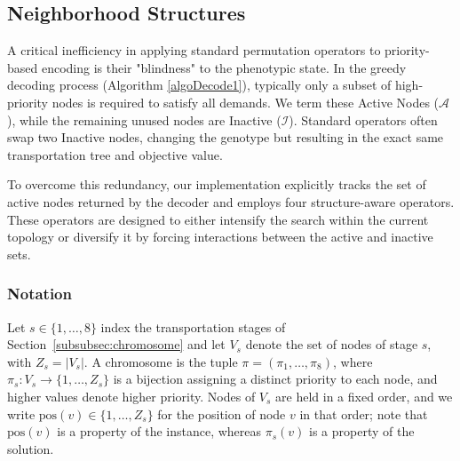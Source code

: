 \documentclass[preprint,12pt,authoryear]{elsarticle}
\begin{document}
\subsection{Neighborhood Structures}
\label{subsec:neighborhoods}

A critical inefficiency in applying standard permutation operators to priority-based encoding is their "blindness" to the phenotypic state.
In the greedy decoding process (Algorithm \ref{algoDecode1}), typically only a subset of high-priority nodes is required to satisfy all demands.
We term these Active Nodes ($\mathcal{A}$), while the remaining unused nodes are Inactive ($\mathcal{I}$). Standard operators
often swap two Inactive nodes, changing the genotype but resulting in the exact same transportation tree and objective value.

To overcome this redundancy, our implementation explicitly tracks the set of active nodes returned by the decoder and employs four structure-aware
operators. These operators are designed to either intensify the search within the current topology or diversify it by forcing interactions between
the active and inactive sets.

\subsubsection{Notation}
\label{subsubsec:op_notation}

Let $s \in \{1, \dots, 8\}$ index the transportation stages of Section~\ref{subsubsec:chromosome} and let $V_s$ denote the set of nodes of stage $s$, with $Z_s = |V_s|$. A chromosome
is the tuple $\pi = (\pi_1, \dots, \pi_8)$, where $\pi_s : V_s \rightarrow \{1, \dots, Z_s\}$ is a bijection assigning a distinct priority to each node, and higher values denote higher
priority. Nodes of $V_s$ are held in a fixed order, and we write $\mathrm{pos}(v) \in \{1, \dots, Z_s\}$ for the position of node $v$ in that order; note that $\mathrm{pos}(v)$ is a
property of the instance, whereas $\pi_s(v)$ is a property of the solution.
\end{document}
